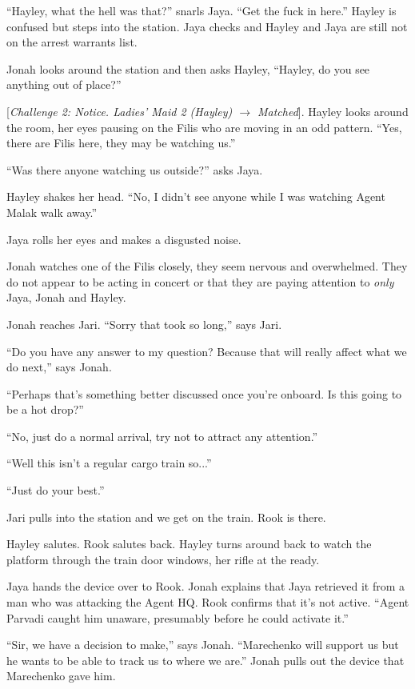 ``Hayley, what the hell was that?'' snarls Jaya.  ``Get the fuck in here.''  Hayley is confused but steps into the station.  Jaya checks and Hayley and Jaya are still not on the arrest warrants list.



Jonah looks around the station and then asks Hayley, ``Hayley, do you see anything out of place?''

{[}\textit{Challenge 2: Notice.  Ladies' Maid 2 (Hayley) $\rightarrow$ Matched}{]}.  Hayley looks around the room, her eyes pausing on the Filis who are moving in an odd pattern.  ``Yes, there are Filis here, they may be watching us.''

``Was there anyone watching us outside?'' asks Jaya.

Hayley shakes her head.  ``No, I didn't see anyone while I was watching Agent Malak walk away.''

Jaya rolls her eyes and makes a disgusted noise.

Jonah watches one of the Filis closely, they seem nervous and overwhelmed.  They do not appear to be acting in concert or that they are paying attention to \textit{only} Jaya, Jonah and Hayley.



Jonah reaches Jari.  ``Sorry that took so long,'' says Jari.

``Do you have any answer to my question?  Because that will really affect what we do next,'' says Jonah.  

``Perhaps that's something better discussed once you're onboard.  Is this going to be a hot drop?''

``No, just do a normal arrival, try not to attract any attention.''

``Well this isn't a regular cargo train so...''

``Just do your best.''



Jari pulls into the station and we get on the train.  Rook is there.

Hayley salutes.  Rook salutes back.  Hayley turns around back to watch the platform through the train door windows, her rifle at the ready.

Jaya hands the device over to Rook.  Jonah explains that Jaya retrieved it from a man who was attacking the Agent HQ.  Rook confirms that it's not active.  ``Agent Parvadi caught him unaware, presumably before he could activate it.''

``Sir, we have a decision to make,'' says Jonah.  ``Marechenko will support us but he wants to be able to track us to where we are.''  Jonah pulls out the device that Marechenko gave him.

